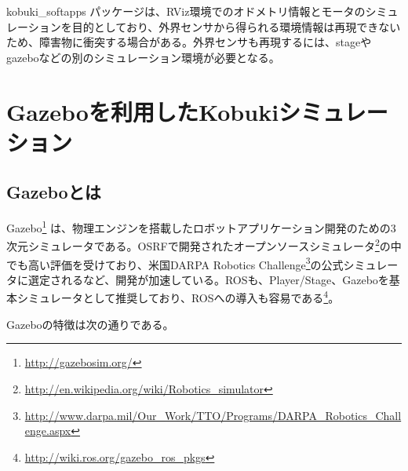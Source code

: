 \begin{itemize}
\begin{exercise}
kobuki\_softapps パッケージは、RViz環境でのオドメトリ情報とモータのシミュレーションを目的としており、外界センサから得られる環境情報は再現できないため、障害物に衝突する場合がある。外界センサも再現するには、stageやgazeboなどの別のシミュレーション環境が必要となる。
\end{exercise}

\section{Gazeboを利用したKobukiシミュレーション}

\subsection{Gazeboとは}

Gazebo\footnote{\url{http://gazebosim.org/}} は、物理エンジンを搭載したロボットアプリケーション開発のための3次元シミュレータである。OSRFで開発されたオープンソースシミュレータ\footnote{\url{http://en.wikipedia.org/wiki/Robotics\_simulator}}の中でも高い評価を受けており、米国DARPA Robotics Challenge\footnote{\url{http://www.darpa.mil/Our\_Work/TTO/Programs/DARPA\_Robotics\_Challenge.aspx}}の公式シミュレータに選定されるなど、開発が加速している。ROSも、Player/Stage、Gazeboを基本シミュレータとして推奨しており、ROSへの導入も容易である\footnote{\url{http://wiki.ros.org/gazebo\_ros\_pkgs}}。

Gazeboの特徴は次の通りである。


\end{itemize}
